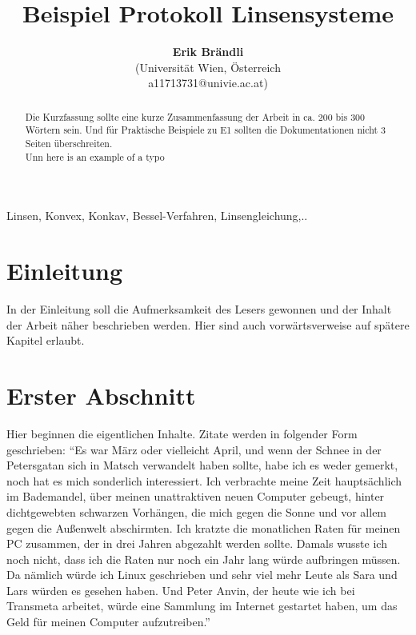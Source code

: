 \documentclass[10pt,a4paper]{article}
\begin{document}
\thispagestyle{empty}
\title{Beispiel Protokoll Linsensysteme}

\author{{\bfseries Erik Brändli}\\
   (Universität Wien, Österreich\\
   a11713731@univie.ac.at)\\
}
\maketitle
\begin{abstract}
Die Kurzfassung sollte eine kurze Zusammenfassung der Arbeit in ca. 200 bis 
300 Wörtern sein. Und für Praktische Beispiele zu E1 sollten die Dokumentationen nicht 3 Seiten überschreiten.\\ 
Unn here is an example of a typo
\end{abstract}

\begin{keywords}
Linsen, Konvex, Konkav, Bessel-Verfahren, Linsengleichung,..
\end{keywords}


\section{Einleitung}

In der Einleitung soll die Aufmerksamkeit des Lesers gewonnen und der Inhalt
der Arbeit näher beschrieben werden. Hier sind auch vorwärtsverweise auf spätere
Kapitel erlaubt. 
\newpage
\section{Erster Abschnitt}

Hier beginnen die eigentlichen Inhalte. Zitate werden in folgender Form 
geschrieben:
"`Es war März oder vielleicht April, und wenn der Schnee in der Petersgatan sich
in Matsch verwandelt haben sollte, habe ich es weder gemerkt, noch hat es mich
sonderlich interessiert. Ich verbrachte meine Zeit hauptsächlich im Bademandel,
über meinen unattraktiven neuen Computer gebeugt, hinter dichtgewebten schwarzen
Vorhängen, die mich gegen die Sonne und vor allem gegen die Außenwelt
abschirmten. Ich kratzte die monatlichen Raten für meinen PC zusammen, der in
drei Jahren abgezahlt werden sollte. Damals wusste ich noch nicht, dass ich die
Raten nur noch ein Jahr lang würde aufbringen müssen. Da nämlich würde ich Linux
geschrieben und sehr viel mehr Leute als Sara und Lars würden es gesehen haben.
Und Peter Anvin, der heute wie ich bei Transmeta arbeitet, würde eine Sammlung
im Internet gestartet haben, um das Geld für meinen Computer
aufzutreiben."'\cite{linus}
\end{document}
